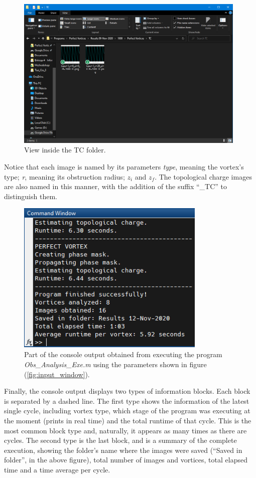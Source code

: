 \begin{figure}[htbp]
    \centering
    \includegraphics[width=11cm]{images/c03/Final_Folder_TC.PNG}
    \caption{View inside the TC folder.}
    \label{fig:final_folder_TC}
\end{figure}

\newpage
Notice that each image is named by its parameters \textit{type}, meaning the vortex's type; \textit{r}, meaning its obstruction radius; $z_i$ and $z_f$. The topological charge images are also named in this manner, with the addition of the suffix ``\_TC'' to distinguish them.

\begin{figure}[htbp]
    \centering
    \includegraphics[width=9cm]{images/c03/Console_Output.PNG}
    \caption{Part of the console output obtained from executing the program \textit{Obs\_Analysis\_Exe.m} using the parameters shown in figure (\ref{fig:input_window}).}
    \label{fig:my_label}
\end{figure}

Finally, the console output displays two types of information blocks. Each block is separated by a dashed line. The first type shows the information of the latest single cycle, including vortex type, which stage of the program was executing at the moment (prints in real time) and the total runtime of that cycle. This is the most common block type and, naturally, it appears as many times as there are cycles. The second type is the last block, and is a summary of the complete execution, showing the folder's name where the images were saved (``Saved in folder'', in the above figure), total number of images and vortices, total elapsed time and a time average per cycle.

